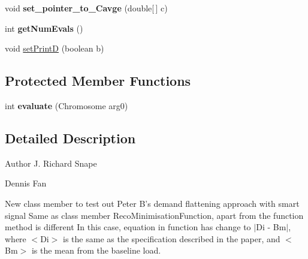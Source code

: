 \begin{DoxyCompactItemize}
\item 
\hypertarget{classuk_1_1ac_1_1dmu_1_1iesd_1_1cascade_1_1util_1_1_minimisation_function_objective_flat_demand_a54be1f9649323228685d7c0360c27ba3}{void {\bfseries set\-\_\-pointer\-\_\-to\-\_\-\-Cavge} (double\mbox{[}$\,$\mbox{]} c)}\label{classuk_1_1ac_1_1dmu_1_1iesd_1_1cascade_1_1util_1_1_minimisation_function_objective_flat_demand_a54be1f9649323228685d7c0360c27ba3}

\item 
\hypertarget{classuk_1_1ac_1_1dmu_1_1iesd_1_1cascade_1_1util_1_1_minimisation_function_objective_flat_demand_aaa488a5dad044435205a3610fd91ed2f}{int {\bfseries get\-Num\-Evals} ()}\label{classuk_1_1ac_1_1dmu_1_1iesd_1_1cascade_1_1util_1_1_minimisation_function_objective_flat_demand_aaa488a5dad044435205a3610fd91ed2f}

\item 
void \hyperlink{classuk_1_1ac_1_1dmu_1_1iesd_1_1cascade_1_1util_1_1_minimisation_function_objective_flat_demand_a7b165f0f14fdc8a1256f01a0cab9bc9f}{set\-Print\-D} (boolean b)
\end{DoxyCompactItemize}
\subsection*{Protected Member Functions}
\begin{DoxyCompactItemize}
\item 
\hypertarget{classuk_1_1ac_1_1dmu_1_1iesd_1_1cascade_1_1util_1_1_minimisation_function_objective_flat_demand_a05f18edb26e5b7b0982b8c34ee71f49e}{int {\bfseries evaluate} (Chromosome arg0)}\label{classuk_1_1ac_1_1dmu_1_1iesd_1_1cascade_1_1util_1_1_minimisation_function_objective_flat_demand_a05f18edb26e5b7b0982b8c34ee71f49e}

\end{DoxyCompactItemize}


\subsection{Detailed Description}
\begin{DoxyAuthor}{Author}
J. Richard Snape 

Dennis Fan
\end{DoxyAuthor}
New class member to test out Peter B's demand flattening approach with smart signal Same as class member Reco\-Minimisation\-Function, apart from the function method is different In this case, equation in function has change to $\vert$\-Di -\/ Bm$\vert$, where $<$\-Di$>$ is the same as the specification described in the paper, and $<$\-Bm$>$ is the mean from the baseline load.

